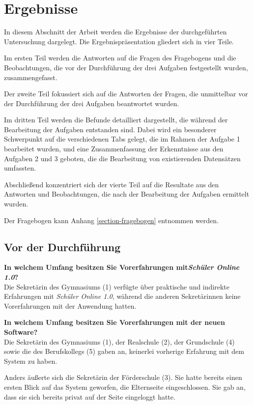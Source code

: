 \section{Ergebnisse}
In diesem Abschnitt der Arbeit werden die Ergebnisse der durchgeführten Untersuchung dargelegt. Die Ergebnispräsentation gliedert sich in vier Teile.

Im ersten Teil werden die Antworten auf die Fragen des Fragebogens und die Beobachtungen, die vor der Durchführung der drei Aufgaben festgestellt wurden, zusammengefasst.

Der zweite Teil fokussiert sich auf die Antworten der Fragen, die unmittelbar vor der Durchführung der drei Aufgaben beantwortet wurden.

Im dritten Teil werden die Befunde detailliert dargestellt, die während der Bearbeitung der Aufgaben entstanden sind. Dabei wird ein besonderer Schwerpunkt auf die verschiedenen Tabs gelegt, die im Rahmen der Aufgabe 1 bearbeitet wurden, und eine Zusammenfassung der Erkenntnisse aus den Aufgaben 2 und 3 geboten, die die Bearbeitung von existierenden Datensätzen umfassten.

Abschließend konzentriert sich der vierte Teil auf die Resultate aus den Antworten und Beobachtungen, die nach der Bearbeitung der Aufgaben ermittelt wurden.

Der Fragebogen kann Anhang \ref{section-fragebogen} entnommen werden. 

\subsection{Vor der Durchführung}
\textbf{In welchem Umfang besitzen Sie Vorerfahrungen mit\textit{Schüler Online 1.0}?}\\
Die Sekretärin des Gymnasiums (1) verfügte über praktische und indirekte Erfahrungen mit \textit{Schüler Online 1.0}, während die anderen Sekretärinnen keine Vorerfahrungen mit der Anwendung hatten.

\textbf{In welchem Umfang besitzen Sie Vorerfahrungen mit der neuen Software?}\\
Die Sekretärin des Gymnasiums (1), der Realschule (2), der Grundschule (4) sowie die des Berufskollegs (5) gaben an, keinerlei vorherige Erfahrung mit dem System zu haben.

Anders äußerte sich die Sekretärin der Förderschule (3). Sie hatte bereits einen ersten Blick auf das System geworfen, die Elternseite eingeschlossen. Sie gab an, dass sie sich bereits privat auf der Seite eingeloggt hatte.

